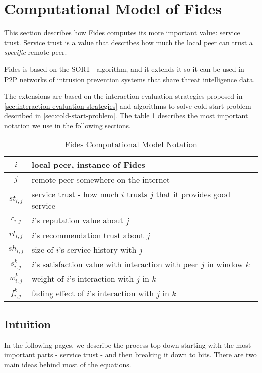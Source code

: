\section{Computational Model of Fides}
\label{sec:computational-model}
This section describes how Fides computes its more important value: service trust. Service trust is a value that describes how much the local peer can trust a \textit{specific} remote peer. 

Fides is based on the SORT~\cite{sort} algorithm, and it extends it so it can be used in P2P networks of intrusion prevention systems that share threat intelligence data.

The extensions are based on the interaction evaluation strategies proposed in \ref{sec:interaction-evaluation-strategies} and algorithms to solve cold start problem described in \ref{sec:cold-start-problem}. 
The table \ref{tab:notation-computational-model} describes the most important notation we use in the following sections.

\begin{table}[ht]
\centering
\begin{tabular}{ c | m{20em} }
 $i$ & local peer, instance of Fides \\
 \hline
 $j$ & remote peer somewhere on the internet \\
 \hline
 $st_{i, j}$ & service trust - how much $i$ trusts $j$ that it provides good service \\
 \hline
 $r_{i, j}$ & $i$'s reputation value about $j$ \\
 \hline
 $rt_{i, j}$ & $i$'s recommendation trust about $j$ \\
 \hline
 $sh_{i, j}$ & size of $i$'s service history with $j$ \\
 \hline
 $s^{k}_{i, j}$ & $i$'s satisfaction value with interaction with peer $j$ in window $k$\\
 \hline
 $w^{k}_{i, j}$ & weight of $i$'s interaction with $j$ in $k$ \\
 \hline
 $f^{k}_{i, j}$ & fading effect of $i$'s interaction with $j$ in $k$ \\
\end{tabular}
\caption{Fides Computational Model Notation}
\label{tab:notation-computational-model}
\end{table}

\subsection{Intuition}
In the following pages, we describe the process top-down starting with the most important parts - service trust - and then breaking it down to bits.
There are two main ideas behind most of the equations. 

